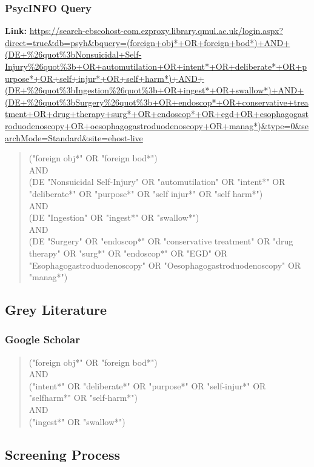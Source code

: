\begin{appendices}
\clearpage

\subsubsection{PsycINFO Query}
\textbf{Link:} \url{https://search-ebscohost-com.ezproxy.library.qmul.ac.uk/login.aspx?direct=true&db=psyh&bquery=(foreign+obj*+OR+foreign+bod*)+AND+(DE+%26quot%3bNonsuicidal+Self-Injury%26quot%3b+OR+automutilation+OR+intent*+OR+deliberate*+OR+purpose*+OR+self+injur*+OR+self+harm*)+AND+(DE+%26quot%3bIngestion%26quot%3b+OR+ingest*+OR+swallow*)+AND+(DE+%26quot%3bSurgery%26quot%3b+OR+endoscop*+OR+conservative+treatment+OR+drug+therapy+surg*+OR+endoscop*+OR+egd+OR+esophagogastroduodenoscopy+OR+oesophagogastroduodenoscopy+OR+manag*)&type=0&searchMode=Standard&site=ehost-live}
\begin{quote}
("foreign obj*" OR "foreign bod*")\\
AND\\
(DE "Nonsuicidal Self-Injury" OR "automutilation" OR "intent*" OR "deliberate*" OR "purpose*" OR "self injur*" OR "self harm*")\\
AND\\
(DE "Ingestion" OR "ingest*" OR "swallow*")\\
AND\\
(DE "Surgery" OR "endoscop*" OR "conservative treatment" OR "drug therapy" OR "surg*" OR "endoscop*" OR "EGD" OR "Esophagogastroduodenoscopy" OR "Oesophagogastroduodenoscopy" OR "manag*")
\end{quote}

\subsection{Grey Literature}

\subsubsection*{Google Scholar}
\begin{quote}
("foreign obj*" OR "foreign bod*")\\
AND\\
("intent*" OR "deliberate*" OR "purpose*" OR "self-injur*" OR "selfharm*" OR "self-harm*")\\
AND\\
("ingest*" OR "swallow*")
\end{quote}

\newpage

\subsection{Screening Process}
\label{appendix:screening_results}



\end{appendices}

